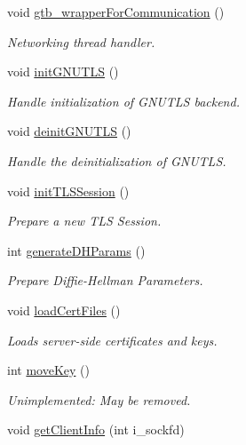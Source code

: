\begin{DoxyCompactItemize}
void \hyperlink{classGTBCommunication_a7d93e8cd8f88f9dc86534d9ecab05f7c}{gtb\-\_\-wrapper\-For\-Communication} ()
\begin{DoxyCompactList}\small\item\em Networking thread handler. \end{DoxyCompactList}\item 
void \hyperlink{classGTBCommunication_ada748d331d99c87beff8f1052e728670}{init\-G\-N\-U\-T\-L\-S} ()
\begin{DoxyCompactList}\small\item\em Handle initialization of G\-N\-U\-T\-L\-S backend. \end{DoxyCompactList}\item 
void \hyperlink{classGTBCommunication_a298abd38038257bf206d22dab7f080f4}{deinit\-G\-N\-U\-T\-L\-S} ()
\begin{DoxyCompactList}\small\item\em Handle the deinitialization of G\-N\-U\-T\-L\-S. \end{DoxyCompactList}\item 
void \hyperlink{classGTBCommunication_a798bd82ec73644b1b7be23431c159993}{init\-T\-L\-S\-Session} ()
\begin{DoxyCompactList}\small\item\em Prepare a new T\-L\-S Session. \end{DoxyCompactList}\item 
int \hyperlink{classGTBCommunication_a22b23cdf3c160d540a1d5dddacf0efdf}{generate\-D\-H\-Params} ()
\begin{DoxyCompactList}\small\item\em Prepare Diffie-\/\-Hellman Parameters. \end{DoxyCompactList}\item 
void \hyperlink{classGTBCommunication_ae6c1cbc4736afe36731d442b72c181e4}{load\-Cert\-Files} ()
\begin{DoxyCompactList}\small\item\em Loads server-\/side certificates and keys. \end{DoxyCompactList}\item 
int \hyperlink{classGTBCommunication_a42a7648197f7ae8f3817aa8ff9ebca73}{move\-Key} ()
\begin{DoxyCompactList}\small\item\em Unimplemented\-: May be removed. \end{DoxyCompactList}\item 
void \hyperlink{classGTBCommunication_a9603172b74add3207353ca4c49bb4290}{get\-Client\-Info} (int i\-\_\-sockfd)

\end{DoxyCompactItemize}
